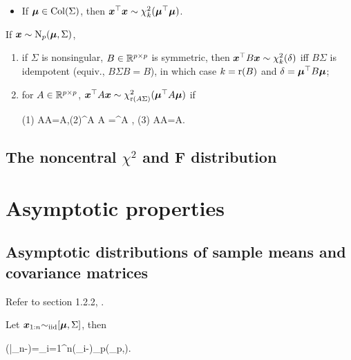 \documentclass[10pt,a4paper]{book}
\begin{document}
\begin{thmbox}
\begin{theorem}
\begin{enumerate}
			\begin{itemize}
				\item If ${\boldsymbol\mu}\in\mathrm{Col}(\Sigma)$, then ${\boldsymbol x}^\top {\boldsymbol x}\sim\chi_k^2({\boldsymbol\mu}^\top {\boldsymbol\mu})$.  
			\end{itemize}
		\end{enumerate}
	\end{theorem}
	\begin{theorem}\label{thm:quad_MVN_general}If ${\boldsymbol x}\sim\mathrm{N}_p({\boldsymbol\mu},\Sigma)$,
		\begin{enumerate}
			\item if $\Sigma$ is nonsingular, $B\in\mathbb R^{p\times p}$ is symmetric, then ${\boldsymbol x}^\top B{\boldsymbol x}\sim\chi_{k}^2(\delta)$ iff $B\Sigma$ is idempotent (equiv., $B\Sigma B=B$), in which case $k=\mathrm{r}(B)$ and $\delta={\boldsymbol\mu}^\top B{\boldsymbol\mu}$;
			\item for $A\in\mathbb R^{p\times p}$, ${\boldsymbol x}^\top A {\boldsymbol x}\sim\chi_{\mathrm{r}(A\Sigma)}^2({\boldsymbol\mu}^\top A{\boldsymbol\mu})$ if 
			\begin{sequation*}
				(1) \Sigma A\Sigma A\Sigma=\Sigma A\Sigma,\quad (2)\bam^\TT A \Sigma A \bam=\bam^\TT A \bam, \quad (3) \Sigma A\Sigma A\bam=\Sigma A\bam.
			\end{sequation*} 
		\end{enumerate}      
	\end{theorem}
\end{thmbox}

\subsection{The noncentral $\chi^2$ and F distribution}\label{sec:noncen_chi2_F}



\section{Asymptotic properties}\label{sec:asym_multi}
\subsection{Asymptotic distributions of sample means and covariance matrices}\label{sec:asym_multi_sampleMeanCov}
Refer to section 1.2.2, \cite{muirhead1982aspects}.
\begin{thmbox}
	\begin{theorem}\label{thm:CLT_multi_sampleMean_iid}
		Let ${\boldsymbol x}_{1:n}{\sim}_{\mathrm{iid}}[{\boldsymbol\mu},\Sigma]$, then 
		\begin{sequation*}
			(\bar{\x}_n-\bam)=\sum_{i=1}^{n}(\x_i-\bam)\dto \rmN_p(\0_p,\Sigma). 
		\end{sequation*} 
	\end{theorem}
\end{thmbox}
\end{document}
